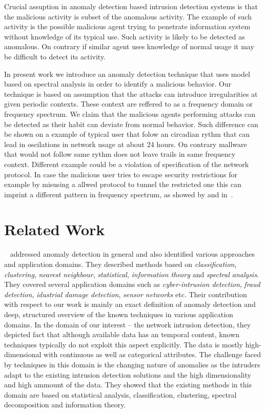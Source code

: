Crucial assuption in anomaly detection based intrusion detection systems is that the malicious activity
is subset of the anomalous activity. The example of such activity is the possible malicious agent
trying to penetrate information system without knowledge of its typical use. Such activity
is likely to be detected as anomalous. On contrary if similar agent uses knowledge of normal usage
it may be difficult to detect its activity.

In present work we introduce an anomaly detection technique that uses model based on spectral analysis in order
to identify a malicious behavior. Our technique is based on assumption that the attacks can introduce
irregularities at given periodic contexts. These context are reffered to as a frequency domain or
frequency spectrum. We claim that the malicious agents performing attacks can be detected as their habit 
can deviate from normal behavior. Such difference can be shown on a example of typical user that 
folow an circadian rythm that can lead in oscilations in network usage at about 24 hours.
On contrary mallware that would not follow same rythm  does not leave trails in same frequency context.
Different example could be a violation of specification of the network protocol.
In case the malicious user tries to escape security restrictions for example  by misusing a allwed
protocol to tunnel  the restricted one this can imprint a different pattern in frequency spectrum, as  
showed by  and  in~\cite{chen2007tcp,chen2007spectral}.

\section{Related Work}

~\cite{chandola2009anomaly} addressed anomaly detection in general and also 
identified various approaches and application domains.
They described methods based on \emph{classification}, \emph{clustering}, \emph{nearest neighbour}, 
\emph{statistical}, \emph{information theory} and \emph{spectral analysis}. 
They covered several application domains such as \emph{cyber-intrusion detection}, \emph{fraud detection}, 
\emph{idustrial damage detection}, \emph{sensor networks} etc. 
Their contribution with respect to our work is mainly an exact definition of anomaly detection and deep, 
structured overview of the known techniques in various application domains. In the domain of our interest --
the network intrusion detection, they depicted fact that although available data has an temporal content, 
known techniques typically do not exploit this aspect explicitly. 
The data is mostly high-dimensional with continuous as well as categorical attributes. 
The challenge faced by techniques in this domain is the changing nature of anomalies as the intruders
adapt to the existing intrusion detection solutions and the high dimensionality and high ammount of
the data. They showed that the existing methods in this domain are based on statistical analysis, classification, 
clustering, spectral decomposition and information theory.
%

